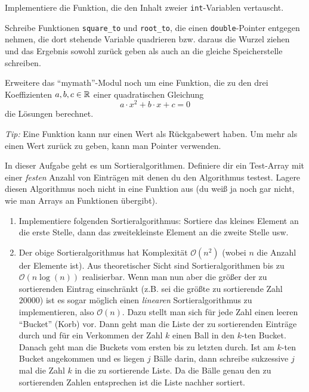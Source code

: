 \documentclass{uebungszettel}
\begin{document}
\begin{aufg}
Implementiere die Funktion, die den Inhalt zweier \verb|int|-Variablen vertauscht.
\end{aufg}

\begin{aufg}
Schreibe Funktionen \verb|square_to| und \verb|root_to|, die einen \verb|double|-Pointer entgegen nehmen, die dort stehende Variable quadrieren bzw. daraus die Wurzel ziehen und das Ergebnis sowohl zurück geben als auch an die gleiche Speicherstelle schreiben.
\end{aufg}

\begin{aufg}
Erweitere das "`mymath"'-Modul noch um eine Funktion, die zu den drei Koeffizienten $a, b, c \in \mathbb{R}$ einer quadratischen Gleichung $$
a \cdot x^2 + b \cdot x + c = 0 $$
die Lösungen berechnet.

\medskip \noindent \emph{Tip:} Eine Funktion kann nur einen Wert als Rückgabewert haben. Um mehr als einen Wert zurück zu geben, kann man Pointer verwenden.
\end{aufg}

\begin{aufg} In dieser Aufgabe geht es um Sortieralgorithmen. Definiere dir ein Test-Array mit einer \emph{festen} Anzahl von Einträgen mit denen du den Algorithmus testest. Lagere diesen Algorithmus noch nicht in eine Funktion aus (du weiß ja noch gar nicht, wie man Arrays an Funktionen übergibt).
\begin{enumerate} 
\item Implementiere folgenden Sortieralgorithmus: Sortiere das kleines Element an die erste Stelle, dann das zweitekleinste Element an die zweite Stelle usw.
\item Der obige Sortieralgorithmus hat Komplexität $\mathcal O(n^2)$ (wobei $n$ die Anzahl der Elemente ist). Aus theoretischer Sicht sind Sortieralgorithmen bis zu $\mathcal O(n \log(n))$ realisierbar. Wenn man nun aber die größer der zu sortierenden Eintrag einschränkt (z.B. sei die größte zu sortierende Zahl $20000$) ist es sogar möglich einen \emph{linearen} Sortieralgorithmus zu implementieren, also $\mathcal O(n)$. Dazu stellt man sich für jede Zahl einen leeren ``Bucket'' (Korb) vor. Dann geht man die Liste der zu sortierenden Einträge durch und für ein Verkommen der Zahl $k$ einen Ball in den $k$-ten Bucket. Danach geht man die Buckets vom ersten bis zu letzten durch. Ist am $k$-ten Bucket angekommen und es liegen $j$ Bälle darin, dann schreibe sukzessive $j$ mal die Zahl $k$ in die zu sortierende Liste. Da die Bälle genau den zu sortierenden Zahlen entsprechen ist die Liste nachher sortiert. 
\end{enumerate}
\end{aufg}
\end{document}
